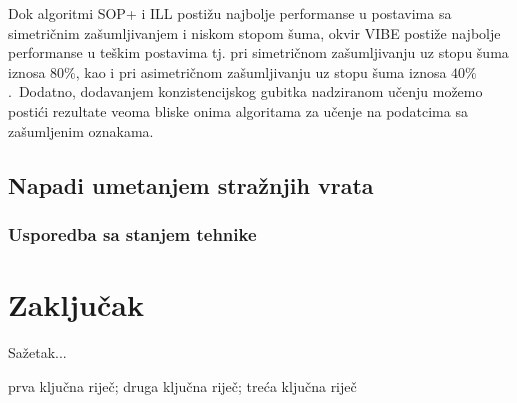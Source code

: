 \documentclass[diplomskirad]{fer}
\begin{document}
Dok algoritmi SOP+ i ILL postižu najbolje performanse u postavima sa simetričnim zašumljivanjem i niskom stopom šuma, okvir VIBE postiže najbolje performanse u teškim postavima tj. pri simetričnom zašumljivanju uz stopu šuma iznosa $80\%$, kao i pri asimetričnom zašumljivanju uz stopu šuma iznosa $40\%$.\ 
Dodatno, dodavanjem konzistencijskog gubitka nadziranom učenju možemo postići rezultate veoma bliske onima algoritama za učenje na podatcima sa zašumljenim oznakama.\ 

\section{Napadi umetanjem stražnjih vrata}
\label{sek:eksp_napadi}

\subsection{Usporedba sa stanjem tehnike}
\label{sub:usporedba_napadi}

\chapter{Zaključak}
\label{pog:zakljucak}







\begin{sazetak}
  Sažetak...
\end{sazetak}

\begin{kljucnerijeci}
  prva ključna riječ; druga ključna riječ; treća ključna riječ
\end{kljucnerijeci}
\end{document}

